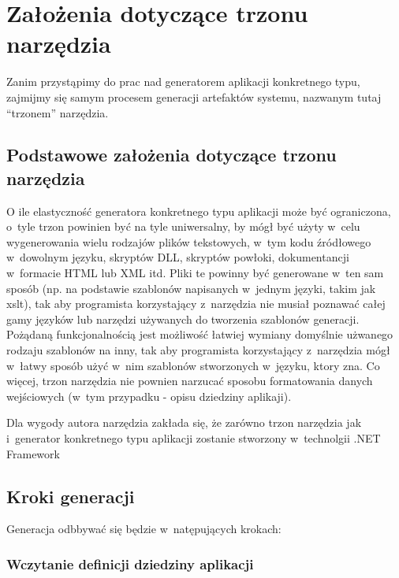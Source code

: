 \chapter{Założenia dotyczące trzonu narzędzia} \label{chap:implementation:core}

Zanim przystąpimy do prac nad generatorem aplikacji konkretnego typu, zajmijmy się samym procesem generacji artefaktów systemu, nazwanym tutaj ``trzonem'' narzędzia.



\section{Podstawowe założenia dotyczące trzonu narzędzia} \label{sec:core:basic_requirements}

O ile elastyczność generatora konkretnego typu aplikacji może być ograniczona, o~tyle trzon powinien być na tyle uniwersalny, by mógł być użyty w~celu wygenerowania wielu rodzajów plików tekstowych, w~tym kodu źródłowego w~dowolnym języku, skryptów DLL, skryptów powłoki, dokumentancji w~formacie HTML lub XML itd.
Pliki te powinny być generowane w~ten sam sposób (np. na podstawie szablonów napisanych w~jednym języki, takim jak xslt), tak aby programista korzystający z~narzędzia nie musiał poznawać całej gamy języków lub narzędzi używanych do tworzenia szablonów generacji.
Pożądaną funkcjonalnością jest możliwość łatwiej wymiany domyślnie użwanego rodzaju szablonów na inny, tak aby programista korzystający z~narzędzia mógł w~łatwy sposób użyć w~nim szablonów stworzonych w~języku, ktory zna.
Co więcej, trzon narzędzia nie pownien narzucać sposobu formatowania danych wejściowych (w~tym przypadku - opisu dziedziny aplikaji).

Dla wygody autora narzędzia zakłada się, że zarówno trzon narzędzia jak i~generator konkretnego typu aplikacji zostanie stworzony w~technolgii .NET Framework



\section{Kroki generacji}

Generacja odbbywać się będzie w~natępujących krokach:


\subsection{Wczytanie definicji dziedziny aplikacji}


